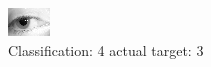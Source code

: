 \begin{figure}[h!]
\begin{center}
\includegraphics[width=0.60\columnwidth]{figures/ID1388_class_4_target_3.png}
\end{center}
\caption{ Classification: 4 actual target: 3}
\label{fig:ID1388_class_4_target_3}
\end{figure}
